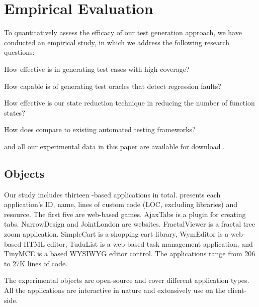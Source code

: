 \section{Empirical Evaluation} \label{Sec:evaluation}

To quantitatively assess the efficacy of our test generation approach, we have conducted an empirical study, in which we address the following research questions:



\begin{description}[noitemsep]
\item [RQ1] How effective is \tool in generating test cases with high coverage?
\item [RQ2] How capable is \tool of generating test oracles that detect regression faults?
\item [RQ3] How effective is our state reduction technique in reducing the number of function states?
\item [RQ4] How does \tool compare to existing automated \javascript testing frameworks?
\end{description} 


\tool and all our experimental data in this paper are available for download \cite{jseft-dl}.



\subsection{Objects}
Our study includes thirteen \javascript-based applications in total. 
 presents each application's ID, name, lines of custom \javascript code (LOC, excluding \javascript libraries) and resource.
The first five are web-based games. AjaxTabs is a \jquery plugin for creating tabs. NarrowDesign and JointLondon are websites. FractalViewer is a fractal tree zoom application. SimpleCart is a  shopping cart library, WymEditor is a web-based HTML editor, Tudu\-List is a web-based task management application, and Tiny\-MCE is a \javascript based WYSIWYG editor control. The applications range from 206 to 27K lines of \javascript code.

The experimental objects are open-source and cover different application types. All the applications are interactive in nature and extensively use \javascript on the client-side. %


